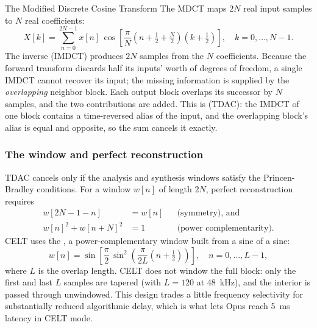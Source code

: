 \begin{concept}{The Modified Discrete Cosine Transform}
  The MDCT maps $2N$ real input samples to $N$ real coefficients:
  \begin{equation}\label{eq:mdct}
    X[k] = \sum_{n=0}^{2N-1} x[n]\,
    \cos\!\left[\frac{\pi}{N}\left(n + \tfrac{1}{2} + \tfrac{N}{2}\right)
    \left(k + \tfrac{1}{2}\right)\right],
    \quad k = 0,\dots,N-1.
  \end{equation}
  The inverse (IMDCT) produces $2N$ samples from the $N$ coefficients. Because
  the forward transform discards half its inputs' worth of degrees of freedom,
  a single IMDCT cannot recover its input; the missing information is
  supplied by
  the \emph{overlapping} neighbor block. Each output block overlaps
  its successor
  by $N$ samples, and the two contributions are added. This is
   (TDAC): the IMDCT of one block
  contains a time-reversed alias of the input, and the overlapping block's alias
  is equal and opposite, so the sum cancels it exactly.
\end{concept}

\subsubsection{The window and perfect reconstruction}

TDAC cancels only if the analysis and synthesis windows satisfy the
Princen-Bradley conditions. For a window $w[n]$ of length $2N$, perfect
reconstruction requires
\begin{align}
  \label{eq:pr_symmetry}
  w[2N - 1 - n] &= w[n] && \text{(symmetry), and}\\
  \label{eq:pr_power}
  w[n]^2 + w[n + N]^2 &= 1 && \text{(power complementarity).}
\end{align}
CELT uses the , a power-complementary window built from a
sine of a sine:
\begin{equation}\label{eq:vorbis_window}
  w[n] = \sin\!\left[\frac{\pi}{2}\,
  \sin^2\!\left(\frac{\pi}{2L}\left(n + \tfrac{1}{2}\right)\right)\right],
  \quad n = 0,\dots,L-1,
\end{equation}
where $L$ is the overlap length. CELT does not window the full block: only the
first and last $L$ samples are tapered (with $L = 120$ at 48~kHz), and the
interior is passed through unwindowed. This 
design trades a
little frequency selectivity for substantially reduced algorithmic delay, which
is what lets Opus reach 5~ms latency in CELT mode.

